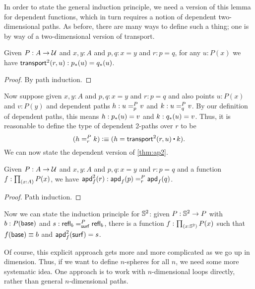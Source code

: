 In order to state the general induction principle, we need a version of this lemma for dependent functions, which in turn requires a notion of dependent two-dimensional paths.
As before, there are many ways to define such a thing; one is by way of a two-dimensional version of transport.

\begin{lem}\label{thm:transport2}
  Given $P:A\to\type$ and $x,y:A$ and $p,q:x=y$ and $r:p=q$, for any $u:P(x)$ we have $\transtwo r u : \trans p u = \trans q u$.
\end{lem}
\begin{proof}
  By path induction.
\end{proof}

Now suppose given $x,y:A$ and $p,q:x=y$ and $r:p=q$ and also points $u:P(x)$ and $v:P(y)$ and dependent paths $h:\dpath P p u v$ and $k:\dpath P q u v$.
By our definition of dependent paths, this means $h:\trans p u = v$ and $k:\trans q u = v$.
Thus, it is reasonable to define the type of dependent 2-paths over $r$ to be
\[ (\dpath P r h k )\defeq (h = \transtwo r u \ct k). \]
We can now state the dependent version of \autoref{thm:ap2}.

\begin{lem}\label{thm:apd2}
  Given $P:A\to\type$ and $x,y:A$ and $p,q:x=y$ and $r:p=q$ and a function $f:\prd{x:A} P(x)$, we have
  $\apdtwo f r : \dpath P r {\apd f p}{\apd f q}$.
\end{lem}
\begin{proof}
  Path induction.
\end{proof}

%
Now we can state the induction principle for $\Sn^2$: given $P:\Sn^2\to P$ with $b:P(\base)$ and $s:\dpath P \surf {\refl b}{\refl b}$, there is a function $f:\prd{x:\Sn^2} P(x)$ such that $f(\base)\jdeq b$ and $\apdtwo f \surf = s$.

%

Of course, this explicit approach gets more and more complicated as we go up in dimension.
Thus, if we want to define $n$-spheres for all $n$, we need some more systematic idea.
One approach is to work with $n$-dimensional loops directly, rather than general $n$-dimensional paths.

